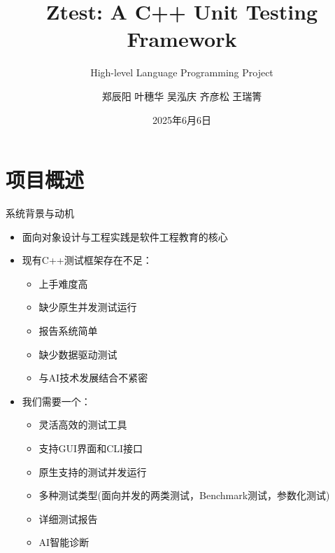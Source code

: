 \documentclass{beamer}
\title{Ztest: A C++ Unit Testing Framework}
\subtitle{High-level Language Programming Project}
\author{郑辰阳 \quad 叶穗华 \quad 吴泓庆 \quad 齐彦松 \quad 王瑞箐}
\institute{未来技术学院 \\ 数据科学与大数据技术}
\date{2025年6月6日}
\begin{document}
\frame{\titlepage}

\section{项目概述}
\begin{frame}{系统背景与动机}
    \begin{itemize}
        \item 面向对象设计与工程实践是软件工程教育的核心
        \item 现有C++测试框架存在不足：
              \begin{itemize}
                  \item 上手难度高
                  \item 缺少原生并发测试运行
                  \item 报告系统简单
                  \item 缺少数据驱动测试
                  \item 与AI技术发展结合不紧密
              \end{itemize}
        \item 我们需要一个：
              \begin{itemize}
                  \item 灵活高效的测试工具
                  \item 支持GUI界面和CLI接口
                  \item 原生支持的测试并发运行
                  \item 多种测试类型(面向并发的两类测试，Benchmark测试，参数化测试)
                  \item 详细测试报告
                  \item AI智能诊断
              \end{itemize}
    \end{itemize}
\end{frame}
\end{document}
